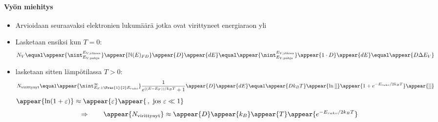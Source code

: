 \begin{frame}
\frametitle{\texorpdfstring{\culine[\sectiontitleulinecolor]{\sectiontitle}}{\sectiontitle} }
\framesubtitle{Vyön miehitys}
\appear{}

\begin{itemize}
	\item Arvioidaan seuraavaksi elektronien lukumäärä jotka ovat virittyneet energiaraon yli 

\item Lasketaan ensiksi  kun $T=0$:
\[
N_{V}  \equal \appear{\nint_{E_{V, \text{pohja}}}^{E_{V, \text{yläosa}}}}  \appear{\mathbb{N} (E)_{F D}} \appear{D} \appear{d E} \equal \appear{\nint_{E_{V, \text{pohja}}}^{E_{V, \text{yläosa}}}} \appear{1 \cdot D} \appear{d E} \equal \appear{D \Delta E_{V}}
\]

\item lasketaan sitten  lämpötilassa $T>0$:
\[
N_{\text {virittynyt}}  \equal \appear{\nint_{E_{F}+\Frac{1}{2} E_{rako}}^{\infty}} \frac{1}{e^{ \textrm{((}E-E_{F} \textrm{))} / k_{B} T}+1} \appear{D} \appear{d E} \equal \appear{D k_{B} T} \appear{\ln  \textrm{[[}}\appear{1+e^{-E_{rako} / 2 k_{B} T}} \appear{\textrm{]]}}
\]
 $\appear{\ln (1+\varepsilon)} \approx \appear{\varepsilon}\appear{\,, \text { jos } \varepsilon \ll 1} $
$$
\Rightarrow \qquad \appear{N_{\text {virittynyt}}} \approx \appear{D} \appear{k_{B}} \appear{T} \appear{e^{-E_{rako} / 2 k_{B} T}}
$$
\end{itemize}

\endofslide 
\end{frame}

